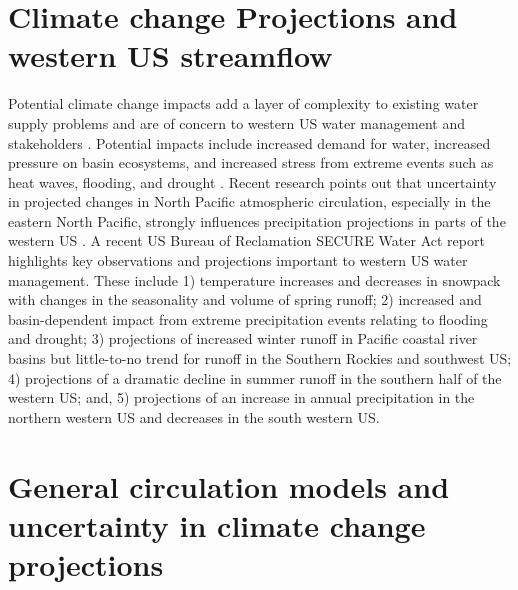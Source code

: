 \documentclass[final, double]{ua-thesis}
\begin{document}
\section{Climate change Projections and western US streamflow}

Potential climate change impacts add a layer of complexity to existing water supply problems and are of concern to western US water management and stakeholders \citep{dettinger_western_2015}. Potential impacts include increased demand for water, increased pressure on basin ecosystems, and increased stress from extreme events such as heat waves, flooding, and drought \citep[e.g., ][]{mote_declining_2005, brekke_addressing_2011, garfin_assessment_2013}. Recent research points out that uncertainty in projected changes in North Pacific atmospheric circulation, especially in the eastern North Pacific, strongly influences precipitation projections in parts of the western US \citep[e.g., ][]{langenbrunner_patterns_2015, choi_uncertainty_2016}. A recent US Bureau of Reclamation SECURE Water Act report \citep{u.s._bureau_of_reclamation_secure_2016} highlights key observations and projections important to western US water management. These include 1) temperature increases and decreases in snowpack with changes in the seasonality and volume of spring runoff; 2) increased and basin-dependent impact from extreme precipitation events relating to flooding and drought; 3) projections of increased winter runoff in Pacific coastal river basins but little-to-no trend for runoff in the Southern Rockies and southwest US; 4) projections of a dramatic decline in summer runoff in the southern half of the western US; and, 5) projections of an increase in annual precipitation in the northern western US and decreases in the south western US.

\section{General circulation models and uncertainty in climate change projections}
\end{document}
